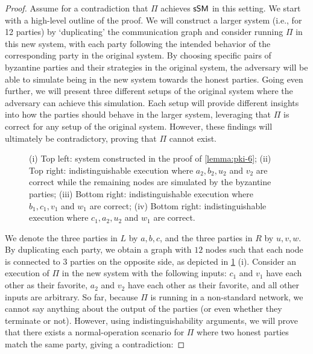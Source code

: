 \begin{proof}
Assume for a contradiction that $\Pi$ achieves $\textsf{sSM}$ in this setting.
We start with a high-level outline of the proof. We will construct a larger system (i.e., for 12 parties) by `duplicating' the communication graph and consider running $\Pi$ in this new system, with each party following the intended behavior of the corresponding party in the original system. By choosing specific pairs of byzantine parties and their strategies in the original system, the adversary will be able to simulate being in the new system towards the honest parties. Going even further, we will present three different setups of the original system where the adversary can achieve this simulation. Each setup will provide different insights into how the parties should behave in the larger system, leveraging that $\Pi$ is correct for any setup of the original system. However, these findings will ultimately be contradictory, proving that $\Pi$ cannot exist.


\begin{figure}[h]
    \centering
    
    \vspace{-1cm}
    \setlength{\belowcaptionskip}{-10pt}
    \caption{(i) Top left: system constructed in the proof of \cref{lemma:pki-6}; (ii) Top right: indistinguishable execution where $a_2, b_2, u_2$ and $v_2$ are correct while the remaining nodes are simulated by the byzantine parties; (iii) Bottom right: indistinguishable execution where $b_1, c_1, v_1$ and $w_1$ are correct; (iv) Bottom right: indistinguishable execution where $c_1, a_2, u_2$ and $w_1$ are correct.}
    \label{fig:no-pki-fully-model}
\end{figure}

We denote the three parties in $L$ by $a, b, c$, and the three parties in $R$ by $u, v, w$.
By duplicating each party, we obtain a graph with $12$ nodes such that each node is connected to $3$ parties on the opposite side, as depicted in \cref{fig:no-pki-fully-model} (i). 
Consider an execution of $\Pi$ in the new system with the following inputs: $c_1$ and $v_1$ have each other as their favorite, $a_2$ and $v_2$ have each other as their favorite, and all other inputs are arbitrary.
So far, because $\Pi$ is running in a non-standard network, we cannot say anything about the output of the parties (or even whether they terminate or not). 
However, using indistinguishability arguments,
we will prove that there exists a normal-operation scenario for $\Pi$ where two honest parties match the same party, giving a contradiction:


\end{proof}
